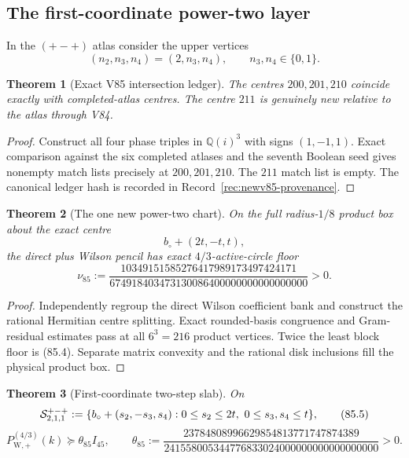 \documentclass[11pt,oneside]{article}
\newtheorem{theorem}{Theorem}[section]
\theoremstyle{definition}
\theoremstyle{remark}
\begin{document}
\subsection{The first-coordinate power-two layer}

In the \((+-+)\) atlas consider the upper vertices
\[
 (n_2,n_3,n_4)=(2,n_3,n_4),\qquad n_3,n_4\in\{0,1\}.
                                                               \tag{85.2}
\]

\begin{theorem}[Exact V85 intersection ledger]
\label{thm:newv85-intersection}
The centres \(200,201,210\) coincide exactly with completed-atlas
centres.  The centre \(211\) is genuinely new relative to the atlas
through V84.
\end{theorem}

\begin{proof}
Construct all four phase triples in \(\mathbb Q(i)^3\) with signs
\((1,-1,1)\).  Exact comparison against the six completed atlases
and the seventh Boolean seed gives nonempty match lists precisely at
\(200,201,210\).  The \(211\) match list is empty.  The canonical
ledger hash is recorded in Record~\ref{rec:newv85-provenance}.
\end{proof}

\begin{theorem}[The one new power-two chart]
\label{thm:newv85-new-chart}
On the full radius-\(1/8\) product box about the exact centre
\[
 b_\circ+(2t,-t,t),                                   \tag{85.3}
\]
the direct plus Wilson pencil has exact \(4/3\)-active-circle floor
\[
\nu_{85}:=
\frac{10349151585276417989173497424171}
     {674918403473130086400000000000000000}>0.         \tag{85.4}
\]
\end{theorem}

\begin{proof}
Independently regroup the direct Wilson coefficient bank and
construct the rational Hermitian centre splitting.  Exact
rounded-basis congruence and Gram-residual estimates pass at all
\(6^3=216\) product vertices.  Twice the least block floor is
(85.4).  Separate matrix convexity and the rational disk inclusions
fill the physical product box.
\end{proof}

\begin{theorem}[First-coordinate two-step slab]
\label{thm:newv85-two-step-slab}
On
\[
 {\cal S}^{+-+}_{2,1,1}:=
 \{b_\circ+(s_2,-s_3,s_4):
 0\leq s_2\leq2t,\ 0\leq s_3,s_4\leq t\},             \tag{85.5}
\]
\[
 P_{\mathrm W,+}^{(4/3)}(k)
 \succeq\theta_{85}I_{45},\qquad
 \theta_{85}:=
 \frac{23784808996629854813771747874389}
 {241558005344776833024000000000000000000}>0.         \tag{85.6}
\]
\end{theorem}
\end{document}
